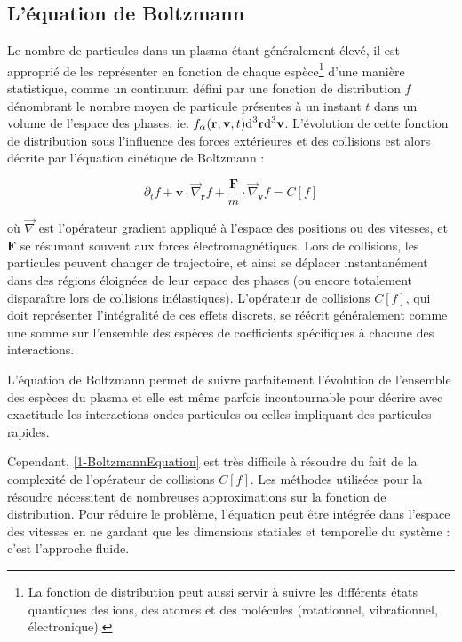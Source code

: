 \begin{refsection}
\subsection{L'équation de Boltzmann}
Le nombre de particules dans un plasma étant généralement élevé, il est
approprié de les représenter en fonction de chaque
espèce\footnote{La fonction de
distribution peut aussi servir à suivre les différents états quantiques des
ions, des atomes et des molécules (rotationnel, vibrationnel, électronique).}
d'une manière statistique, comme un continuum défini par une fonction de
distribution $f$ dénombrant le nombre moyen de particule présentes à un instant
$t$ dans un volume de l'espace des phases, ie. $f_\alpha(\mathbf r,\mathbf
v,t)\text{d}^{{3}}\mathbf r\text{d}^{{3}}\mathbf v$.
L'évolution de cette fonction de distribution sous l'influence des forces
extérieures et des collisions est alors décrite par l'équation cinétique de
Boltzmann :

\begin{equation}
\label{1-BoltzmannEquation}
\partial_tf+\mathbf{v}\cdot\vec\nabla_\mathbf{r}f+
\frac{\mathbf{F}}{m}\cdot\vec\nabla_{\mathbf{v}}f
=C[f]
\end{equation}

où $\vec\nabla$ est l'opérateur gradient appliqué à l'espace des positions ou
des vitesses, et $\mathbf{F}$ se résumant souvent aux forces
électromagnétiques. Lors de collisions, les particules peuvent changer de
trajectoire, et ainsi se déplacer instantanément dans des régions éloignées de leur espace des
phases (ou encore totalement disparaître lors de collisions inélastiques).
L'opérateur de collisions $C[f]$, qui doit représenter l'intégralité de
ces effets discrets, se réécrit généralement comme une somme sur l'ensemble des
espèces de coefficients spécifiques à chacune des interactions.

L'équation de Boltzmann permet de suivre
parfaitement l'évolution de l'ensemble des espèces du plasma et elle est
même parfois incontournable pour décrire avec exactitude les interactions
ondes-particules ou celles impliquant des particules rapides. 

Cependant, \eqref{1-BoltzmannEquation} est très
difficile à résoudre du fait de la complexité de l'opérateur de collisions
$C[f]$. Les méthodes utilisées pour la résoudre nécessitent de nombreuses
approximations sur la fonction de distribution\parencite{HagelaarHDR}. Pour
réduire le problème, l'équation peut être intégrée dans l'espace des vitesses
en ne gardant que les dimensions statiales et temporelle du système : c'est
l'approche fluide.


\end{refsection}
